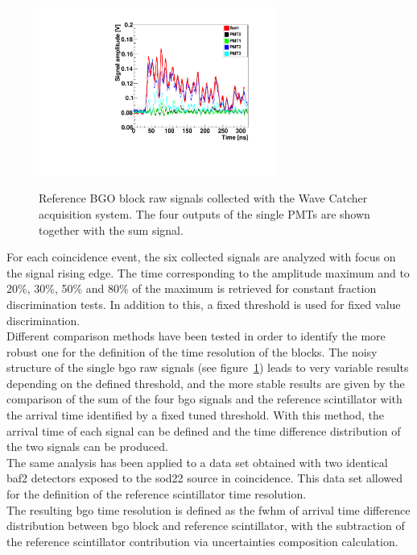 \begin{figure} [!h]
\centering
{\includegraphics[width=0.7\textwidth]{03_GraphicFiles/chapter3_CLaRySproto/Absorber/images/raw_signalExample.pdf}}
\caption{Reference BGO block raw signals collected with the Wave Catcher acquisition system. The four outputs of the single PMTs are shown together with the sum signal.}
\label{chap3::fig::raw_signal}
\end{figure}


For each coincidence event, the six collected signals are analyzed with focus on the signal rising edge. The time corresponding to the amplitude maximum and to 20\%, 30\%, 50\% and 80\% of the maximum is retrieved for constant fraction discrimination tests. In addition to this, a fixed threshold is used for fixed value discrimination.\\
Different comparison methods have been tested in order to identify the more robust one for the definition of the time resolution of the blocks. The noisy structure of the single \gls{bgo} raw signals (see figure~\ref{chap3::fig::raw_signal})  leads to very variable results depending on the defined threshold, and the more stable results are given by the comparison of the sum of the four \gls{bgo} signals and the reference scintillator with the arrival time identified by a fixed tuned threshold. With this method, the arrival time of each signal can be defined and the time difference distribution of the two signals can be produced.\\
The same analysis has been applied to a data set obtained with two identical \gls{baf2} detectors exposed to the \gls{sod22} source in coincidence. This data set allowed for the definition of the reference scintillator time resolution.\\
The resulting \gls{bgo} time resolution is defined as the \gls{fwhm} of arrival time difference distribution between \gls{bgo} block and reference scintillator, with the subtraction of the reference scintillator contribution via uncertainties composition calculation.\\


